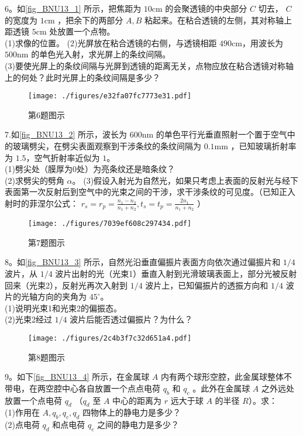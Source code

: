 6。如\autoref{fig_BNU13_1} 所示，把焦距为 $10\mathrm{cm}$ 的会聚透镜的中央部分 $C$ 切去， $C$ 的宽度为 $1\mathrm{cm}$ ，把余下的两部分 $A,B$ 粘起来。在粘合透镜的左侧，其对称轴上距透镜 $5\mathrm{cm}$ 处放置一个点物。\\
(1)求像的位置。
(2)光屏放在粘合透镜的右侧，与透镜相距 $490\mathrm{cm}$，用波长为 $500\mathrm{nm}$ 的单色光入射，求光屏上的条纹间隔。\\
(3)要使光屏上的条纹间隔与光屏到透镜的距离无关，点物应放在粘合透镜对称轴上的何处？此时光屏上的条纹间隔是多少？
\begin{figure}[ht]
\centering
\texttt{[image: ./figures/e32fa07fc7773e31.pdf]}
\caption{第6题图示} \label{fig_BNU13_1}
\end{figure}
7.如\autoref{fig_BNU13_2} 所示，波长为 $600\mathrm{nm}$ 的单色平行光垂直照射一个置于空气中的玻璃劈尖，在劈尖表面观察到干涉条纹的条纹间隔为 $0.1\mathrm{mm}$ ，已知玻璃折射率为 $1.5$，空气折射率近似为 $1$。\\
(1)劈尖处（膜厚为0处）为亮条纹还是暗条纹？\\
(2)求劈尖的劈角 $\alpha$。
(3)假设入射光为自然光，如果只考虑上表面的反射光与经下表面第一次反射后到空气中的光束之间的干涉，求干涉条纹的可见度。（已知正入射时的菲涅尔公式： $r_s=r_p=\frac{n_1-n_2}{n_1+n_2},t_s=t_p=\frac{2n_1}{n_1+n_2}$ ）
\begin{figure}[ht]
\centering
\texttt{[image: ./figures/7039ef608c297434.pdf]}
\caption{第7题图示} \label{fig_BNU13_2}
\end{figure}
8。如\autoref{fig_BNU13_3} 所示，自然光沿垂直偏振片表面方向依次通过偏振片和 $1/4$ 波片，从 $1/4$ 波片出射的光（光束1）垂直入射到光滑玻璃表面上，部分光被反射回来（光束2），反射光再次入射到 $1/4$ 波片上，已知偏振片的透振方向和 $1/4$ 波片的光轴方向的夹角为 $45^\circ$。\\
(1)说明光束1和光束2的偏振态。\\
(2)光束2经过 $1/4$ 波片后能否透过偏振片？为什么？
\begin{figure}[ht]
\centering
\texttt{[image: ./figures/2c4b3f7c32d651a4.pdf]}
\caption{第8题图示} \label{fig_BNU13_3}
\end{figure}
9。如下\autoref{fig_BNU13_4} 所示，在金属球 $A$ 内有两个球形空腔，此金属球整体不带电，在两空腔中心各自放置一个点点电荷 $q_b$ 和 $q_c$ 。此外在金属球 $A$ 之外远处放置一个点电荷 $q_d$ （$q_d$ 至 $A$ 中心的距离为 $r$ 远大于球 $A$ 的半径 $R$）。求：\\
(1)作用在 $A,q_b,q_c,q_d$ 四物体上的静电力是多少？\\
(2)点电荷 $q_d$ 和点电荷 $q_c$ 之间的静电力是多少？\\
